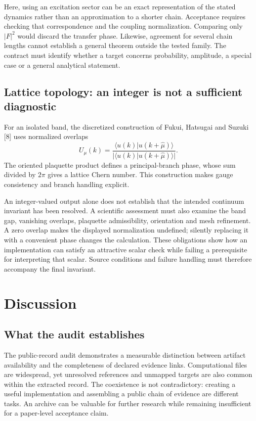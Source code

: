 \documentclass[10pt,a4paper]{article}
\begin{document}
Here, using an excitation sector can be an exact representation of the
stated dynamics rather than an approximation to a shorter chain.
Acceptance requires checking that correspondence and the coupling
normalization. Comparing only \(|F|^2\) would discard the transfer
phase. Likewise, agreement for several chain lengths cannot establish a
general theorem outside the tested family. The contract must identify
whether a target concerns probability, amplitude, a special case or a
general analytical statement.

\subsection{Lattice topology: an integer is not a sufficient
diagnostic}\label{lattice-topology-an-integer-is-not-a-sufficient-diagnostic}

For an isolated band, the discretized construction of Fukui, Hatsugai
and Suzuki {[}8{]} uses normalized overlaps \[
U_\mu(k)=\frac{\langle u(k)|u(k+\hat\mu)\rangle}
{|\langle u(k)|u(k+\hat\mu)\rangle|}.
\] The oriented plaquette product defines a principal-branch phase,
whose sum divided by \(2\pi\) gives a lattice Chern number. This
construction makes gauge consistency and branch handling explicit.

An integer-valued output alone does not establish that the intended
continuum invariant has been resolved. A scientific assessment must also
examine the band gap, vanishing overlaps, plaquette admissibility,
orientation and mesh refinement. A zero overlap makes the displayed
normalization undefined; silently replacing it with a convenient phase
changes the calculation. These obligations show how an implementation
can satisfy an attractive scalar check while failing a prerequisite for
interpreting that scalar. Source conditions and failure handling must
therefore accompany the final invariant.

\section{Discussion}\label{discussion}

\subsection{What the audit
establishes}\label{what-the-audit-establishes}

The public-record audit demonstrates a measurable distinction between
artifact availability and the completeness of declared evidence links.
Computational files are widespread, yet unresolved references and
unmapped targets are also common within the extracted record. The
coexistence is not contradictory: creating a useful implementation and
assembling a public chain of evidence are different tasks. An archive
can be valuable for further research while remaining insufficient for a
paper-level acceptance claim.
\end{document}
